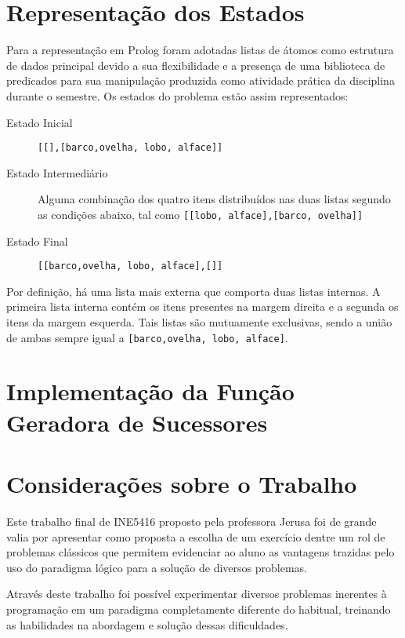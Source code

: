 \documentclass[brazil,times]{abnt}
\begin{document}
\section*{Representação dos Estados}
	Para a representação em Prolog foram adotadas listas de átomos como
	estrutura de dados principal devido a sua flexibilidade e a presença de uma
	biblioteca de predicados para sua manipulação produzida como atividade
	prática da disciplina durante o semestre. Os estados do problema estão assim
	representados:
	
	\begin{description}
		\item[Estado Inicial] \texttt{[[],[barco,ovelha, lobo, alface]]}
		\item[Estado Intermediário] Alguma combinação dos quatro itens distribuídos
		nas duas listas segundo as condições abaixo, tal como \texttt{[[lobo,
		alface],[barco, ovelha]]}
		\item[Estado Final] \texttt{[[barco,ovelha, lobo, alface],[]]}
	\end{description}

	Por definição, há uma lista mais externa que comporta duas listas internas. A
	primeira lista interna contém os itens presentes na margem direita e a segunda
	os itens da margem esquerda. Tais listas são mutuamente exclusivas, sendo a
	união de ambas sempre igual a \texttt{[barco,ovelha, lobo, alface]}.
	
	
\section*{Implementação da Função Geradora de Sucessores}
	

\section*{Considerações sobre o Trabalho}
	Este trabalho final de INE5416 proposto pela professora Jerusa foi de grande
	valia por apresentar como proposta a escolha de um exercício dentre um rol de
	problemas clássicos que permitem evidenciar ao aluno as vantagens trazidas pelo
	uso do paradigma lógico para a solução de diversos problemas.

	Através deste trabalho foi possível experimentar diversos problemas inerentes à
	programação em um paradigma completamente diferente do habitual, treinando as
	habilidades na abordagem e solução dessas dificuldades.
	
\end{document}
